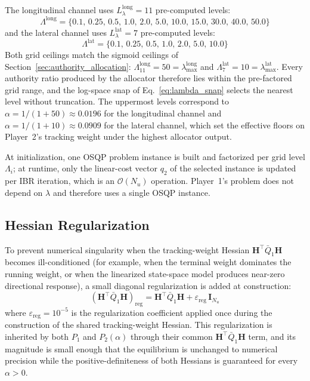 \documentclass[12pt,a4paper,oneside]{report}
\begin{document}
The longitudinal channel uses $L_\lambda^{\text{long}} = 11$ pre-computed levels:
\begin{equation}
\Lambda^{\text{long}} = \{0.1, \, 0.25, \, 0.5, \, 1.0, \, 2.0, \, 5.0, \, 10.0, \, 15.0, \, 30.0, \, 40.0, \, 50.0\}
\label{eq:long_levels}
\end{equation}
and the lateral channel uses $L_\lambda^{\text{lat}} = 7$ pre-computed levels:
\begin{equation}
\Lambda^{\text{lat}} = \{0.1, \, 0.25, \, 0.5, \, 1.0, \, 2.0, \, 5.0, \, 10.0\}
\label{eq:lat_levels}
\end{equation}
Both grid ceilings match the sigmoid ceilings of Section~\ref{sec:authority_allocation}: $\Lambda_{11}^{\text{long}} = 50 = \lambda_{\max}^{\text{long}}$ and $\Lambda_7^{\text{lat}} = 10 = \lambda_{\max}^{\text{lat}}$. Every authority ratio produced by the allocator therefore lies within the pre-factored grid range, and the log-space snap of Eq.~\eqref{eq:lambda_snap} selects the nearest level without truncation. The uppermost levels correspond to $\alpha = 1/(1 + 50) \approx 0.0196$ for the longitudinal channel and $\alpha = 1/(1 + 10) \approx 0.0909$ for the lateral channel, which set the effective floors on Player~2's tracking weight under the highest allocator output.

At initialization, one OSQP problem instance is built and factorized per grid level $\Lambda_i$; at runtime, only the linear-cost vector $q_2$ of the selected instance is updated per IBR iteration, which is an $\mathcal{O}(N_u)$ operation. Player~1's problem does not depend on $\lambda$ and therefore uses a single OSQP instance.

\subsection{Hessian Regularization}
\label{sec:hessian_regularization}

To prevent numerical singularity when the tracking-weight Hessian $\mathbf{H}^{\top} \bar{Q}_1 \mathbf{H}$ becomes ill-conditioned (for example, when the terminal weight dominates the running weight, or when the linearized state-space model produces near-zero directional response), a small diagonal regularization is added at construction:
\begin{equation}
\left( \mathbf{H}^{\top} \bar{Q}_1 \mathbf{H} \right)_{\text{reg}} = \mathbf{H}^{\top} \bar{Q}_1 \mathbf{H} + \varepsilon_{\text{reg}} \, \mathbf{I}_{N_u}
\label{eq:reg}
\end{equation}
where $\varepsilon_{\text{reg}} = 10^{-5}$ is the regularization coefficient applied once during the construction of the shared tracking-weight Hessian. This regularization is inherited by both $P_1$ and $P_2(\alpha)$ through their common $\mathbf{H}^{\top} \bar{Q}_1 \mathbf{H}$ term, and its magnitude is small enough that the equilibrium is unchanged to numerical precision while the positive-definiteness of both Hessians is guaranteed for every $\alpha > 0$.
\end{document}
